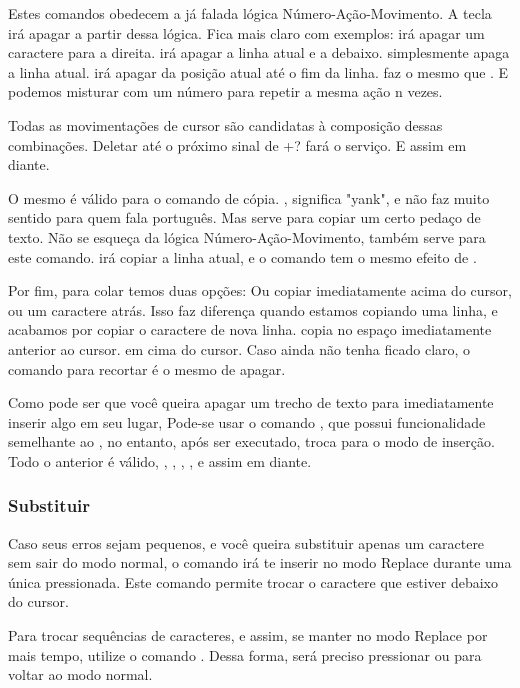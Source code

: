 \documentclass[a4paper, 12pt]{article}
\begin{document}
Estes comandos obedecem a já falada lógica Número-Ação-Movimento.
A tecla  irá apagar a partir dessa lógica.
Fica mais claro com exemplos:  irá apagar um caractere para a direita.
 irá apagar a linha atual e a debaixo.
 simplesmente apaga a linha atual.
 irá apagar da posição atual até o fim da linha.
 faz o mesmo que .
E podemos misturar com um número para repetir a mesma ação n vezes.

Todas as movimentações de cursor são candidatas à composição dessas combinações.
Deletar até o próximo sinal de +?  fará o serviço.
E assim em diante.

O mesmo é válido para o comando de cópia.
, significa "yank", e não faz muito sentido para quem fala português.
Mas serve para copiar um certo pedaço de texto.
Não se esqueça da lógica Número-Ação-Movimento, também serve para este comando.
 irá copiar a linha atual, e o comando  tem o mesmo efeito de .

Por fim, para colar temos duas opções: Ou copiar imediatamente acima do cursor, ou um caractere atrás.
Isso faz diferença quando estamos copiando uma linha, e acabamos por copiar o caractere de nova linha.
 copia no espaço imediatamente anterior ao cursor.  em cima do cursor.
Caso ainda não tenha ficado claro, o comando para recortar é o mesmo de apagar.

Como pode ser que você queira apagar um trecho de texto para imediatamente inserir algo em seu lugar,
Pode-se usar o comando , que possui funcionalidade semelhante ao ,
no entanto, após ser executado, troca para o modo de inserção.
Todo o anterior é válido, , , , , e assim em diante.

\subsubsection{Substituir}
Caso seus erros sejam pequenos, e você queira substituir apenas um caractere sem sair do modo normal,
o comando  irá te inserir no modo Replace durante uma única pressionada.
Este comando permite trocar o caractere que estiver debaixo do cursor.

Para trocar sequências de caracteres, e assim, se manter no modo Replace por mais tempo, utilize o comando .
Dessa forma, será preciso pressionar  ou  para voltar ao modo normal.
\end{document}

